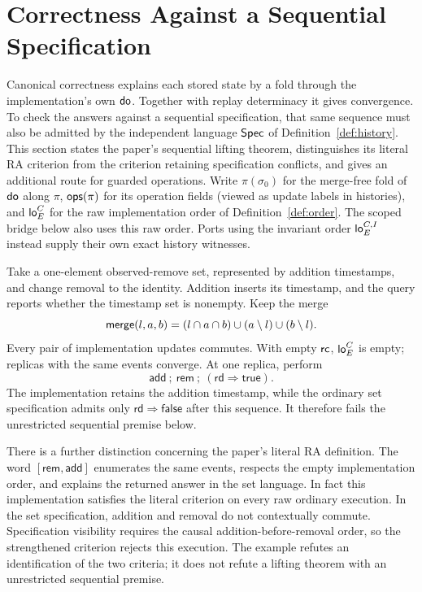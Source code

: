 \section{Correctness Against a Sequential Specification}
\label{sec:history-bridge}

Canonical correctness explains each stored state by a fold through the
implementation's own $\mathsf{do}$. Together with replay determinacy it gives
convergence. To check the answers against a sequential specification, that same
sequence must also be admitted by the independent language $\mathsf{Spec}$ of
Definition~\ref{def:history}. This section states the paper's sequential lifting
theorem, distinguishes its literal RA criterion from the criterion retaining
specification conflicts, and gives an additional route for guarded operations.
Write $\pi(\sigma_0)$ for the merge-free fold of $\mathsf{do}$ along $\pi$,
$\mathsf{ops}(\pi)$ for its operation fields (viewed as update labels in histories),
and $\mathsf{lo}^{C}_{E}$ for the raw implementation order of Definition~\ref{def:order}. The scoped bridge below also uses this raw order. Ports using the invariant
order $\mathsf{lo}^{C,I}_E$ instead supply their own exact history witnesses.

\begin{example}
\label{ex:broken-set}
Take a one-element observed-remove set, represented by addition timestamps,
and change removal to the identity. Addition inserts its timestamp, and the
query reports whether the timestamp set is nonempty. Keep the merge
\[
 \mathsf{merge}(l,a,b)=(l\cap a\cap b)\cup(a\setminus l)\cup(b\setminus l).
\]
Every pair of implementation updates commutes. With empty $\mathsf{rc}$,
$\mathsf{lo}^{C}_{E}$ is empty; replicas with the same events converge.
At one replica, perform
\[
 \mathsf{add}\ ;\ \mathsf{rem}\ ;\
 (\mathsf{rd}\Rightarrow\mathsf{true}).
\]
The implementation retains the addition timestamp, while the ordinary set
specification admits only $\mathsf{rd}\Rightarrow\mathsf{false}$ after this
sequence. It therefore fails the unrestricted sequential premise below.

There is a further distinction concerning the paper's literal RA definition.
The word $[\mathsf{rem},\mathsf{add}]$ enumerates the same events, respects the
empty implementation order, and explains the returned answer in the set
language. In fact this implementation satisfies the literal criterion on every
raw ordinary execution. In the set specification, addition and removal do not
contextually commute. Specification visibility requires the causal
addition-before-removal order, so the strengthened criterion rejects this
execution. The example refutes an identification of the two criteria; it does
not refute a lifting theorem with an unrestricted sequential premise.
\end{example}

